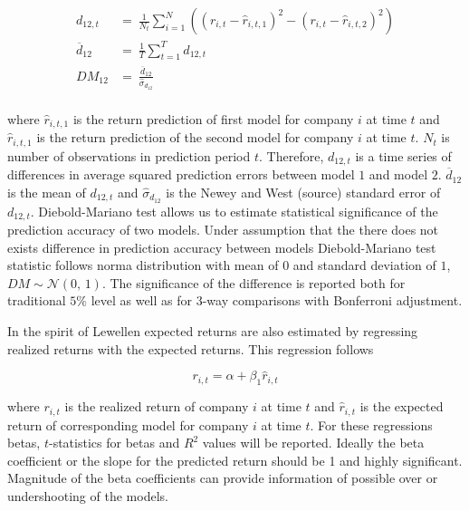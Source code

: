 \documentclass{article}
\begin{document}
\begin{equation}
\label{eq:Diebold-Mariano}
\begin{split}
 d_{12, t} 			& = \ \frac{1}{N_{t}}  \sum^N_{i=1}((r_{i, t} - \hat r_{i, t, 1})^2 - (r_{i, t} - \hat r_{i, t, 2})^2) \\
\overline{d}_{12} 	& = \ \frac{1}{T} \sum^T_{t=1} d_{12, t} \\
DM_{12} 			& = \ \frac{\overline{d}_{12}}{\hat \sigma_{d_{12}}} \\
\end{split}
\end{equation}

where $\hat r_{i, t, 1}$ is the return prediction of first model for company $i$ at time $t$ and $\hat r_{i, t, 1}$ is the return prediction of the second model  for company $i$ at time $t$. $N_t$ is number of observations in prediction period $t$. Therefore, $d_{12, t}$ is a time series of differences in average squared prediction errors between model $1$ and model $2$. $\overline{d}_{12}$ is the mean of $d_{12, t}$ and $\hat \sigma_{d_{12}}$ is the Newey and West (source) standard error of $d_{12, t}$. Diebold-Mariano test allows us to estimate statistical significance of the prediction accuracy of two models. Under assumption that the there does not exists difference in prediction accuracy between models Diebold-Mariano test statistic follows norma distribution with mean of $0$ and standard deviation of $1$, $DM \sim \mathcal{N}(0,\, 1)$. The significance of the difference is reported both for traditional $5\%$ level as well as for 3-way comparisons with Bonferroni adjustment. \par

In the spirit of Lewellen \citeyear{Lewellen2015} expected returns are also estimated by regressing realized returns with the expected returns. This regression follows \par

\begin{equation}
\label{eq:realizedRegression}
r_{i, t} = \alpha + \beta_1 \hat r_{i, t}
\end{equation}

where $r_{i, t}$ is the realized return of company $i$ at time $t$ and $\hat r_{i, t}$ is the expected return of corresponding model for company $i$ at time $t$. For these regressions betas, $t$-statistics for betas and $R^2$ values will be reported. Ideally the beta coefficient or the slope for the predicted return should be 1 and highly significant. Magnitude of the beta coefficients can provide information of possible over or undershooting of the models. \par
\end{document}
